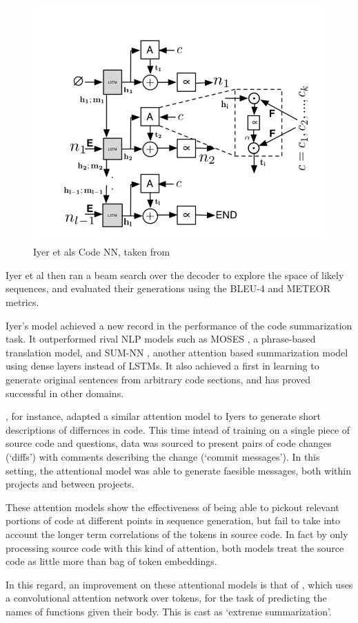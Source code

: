 \begin{figure}[tb]
    \centering
    \includegraphics[width=0.5\linewidth]{ModelPics/Iyer_etal.png}
    \caption{Iyer et als Code NN, taken from \cite{iyer_summarizing_2016}}
    \label{fig:Iyer}
\end{figure}

Iyer et al then ran a beam search over the decoder to explore the space of likely sequences, and evaluated their generations using the BLEU-4 \citep{papineni_bleu_2001} and METEOR \citep{denkowski:lavie:meteor-wmt:2014} metrics.

Iyer's model achieved a new record in the performance of the code summarization task. 
It outperformed rival NLP models such as MOSES \citep{Koehn:2007:MOS:1557769.1557821}, a phrase-based translation model, and SUM-NN \citep{rush_neural_2015}, another attention based summarization model using dense layers instead of LSTMs. 
It also achieved a first in learning to generate original sentences from arbitrary code sections, and has proved successful in other domains.  

\citet{loyola_neural_2017}, for instance, adapted a similar attention model to Iyers to generate short descriptions of differnces in code.
This time intead of training on a single piece of source code and questions, data was sourced to present pairs of code changes (`diffs') with comments describing the change (`commit messages'). 
In this setting, the attentional model was able to generate faesible messages, both within projects and between projects.

These attention models show the effectiveness of being able to pickout relevant portions of code at different points in sequence generation, but fail to take into account the longer term correlations of the tokens in source code. In fact by only processing source code with this kind of attention, both models treat the source code as little more than bag of token embeddings.

In this regard, an improvement on these attentional models is that of \citet{allamanis_convolutional_2016}, which uses a convolutional attention network over tokens, for the task of predicting the names of functions given their body. This is cast as `extreme summarization'.

